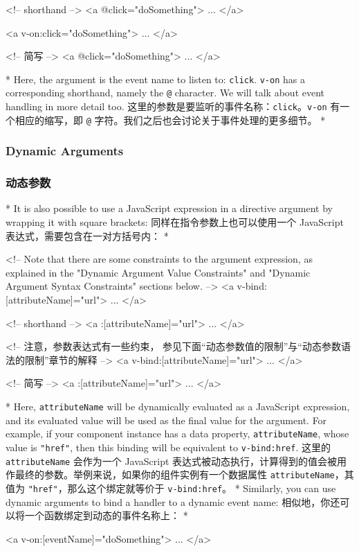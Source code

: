 \begin{paracol}{2}
\begin{codeHtml}
<!-- shorthand -->
<a @click="doSomething"> ... </a>
\end{codeHtml}  
\switchcolumn
\begin{codeHtml}
<a v-on:click="doSomething"> ... </a>

<!-- 简写 -->
<a @click="doSomething"> ... </a>
\end{codeHtml}  

\switchcolumn[0]*%
Here, the argument is the event name to listen to: \texttt{click}.
\texttt{v-on} has a corresponding shorthand, namely the \texttt{@}
character. We will talk about event handling in more detail too.
\switchcolumn
这里的参数是要监听的事件名称：\texttt{click}。\texttt{v-on}
有一个相应的缩写，即 \texttt{@}
字符。我们之后也会讨论关于事件处理的更多细节。
\switchcolumn[0]*%
\subsubsection{Dynamic Arguments}
\switchcolumn
\subsubsection{动态参数}
\switchcolumn[0]*%
It is also possible to use a JavaScript expression in a directive
argument by wrapping it with square brackets:
\switchcolumn
同样在指令参数上也可以使用一个 JavaScript
表达式，需要包含在一对方括号内：
\switchcolumn[0]*%
\begin{codeHtml}
<!--
Note that there are some constraints to the argument expression,
as explained in the "Dynamic Argument Value Constraints" 
and "Dynamic Argument Syntax Constraints" sections below.
-->
<a v-bind:[attributeName]="url"> ... </a>

<!-- shorthand -->
<a :[attributeName]="url"> ... </a>
\end{codeHtml}  
\switchcolumn
\begin{codeHtml}
<!--
注意，参数表达式有一些约束，
参见下面“动态参数值的限制”与“动态参数语法的限制”章节的解释
-->
<a v-bind:[attributeName]="url"> ... </a>

<!-- 简写 -->
<a :[attributeName]="url"> ... </a>
\end{codeHtml}  

\switchcolumn[0]*%
Here, \texttt{attributeName} will be dynamically evaluated as a
JavaScript expression, and its evaluated value will be used as the final
value for the argument. For example, if your component instance has a
data property, \texttt{attributeName}, whose value is \texttt{"href"},
then this binding will be equivalent to \texttt{v-bind:href}.
\switchcolumn
这里的 \texttt{attributeName} 会作为一个 JavaScript
表达式被动态执行，计算得到的值会被用作最终的参数。举例来说，如果你的组件实例有一个数据属性
\texttt{attributeName}，其值为 \texttt{"href"}，那么这个绑定就等价于
\texttt{v-bind:href}。
\switchcolumn[0]*%
Similarly, you can use dynamic arguments to bind a handler to a dynamic
event name:
\switchcolumn
相似地，你还可以将一个函数绑定到动态的事件名称上：
\switchcolumn[0]*%
\begin{codeHtml}
<a v-on:[eventName]="doSomething"> ... </a>


\end{codeHtml}
\end{paracol}

